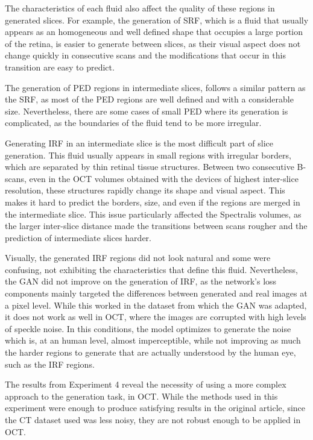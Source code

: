 \par
The characteristics of each fluid also affect the quality of these regions in generated slices. For example, the generation of SRF, which is a fluid that usually appears as an homogeneous and well defined shape that occupies a large portion of the retina, is easier to generate between slices, as their visual aspect does not change quickly in consecutive scans and the modifications that occur in this transition are easy to predict.
\par
The generation of PED regions in intermediate slices, follows a similar pattern as the SRF, as most of the PED regions are well defined and with a considerable size. Nevertheless, there are some cases of small PED where its generation is complicated, as the boundaries of the fluid tend to be more irregular.
\par
Generating IRF in an intermediate slice is the most difficult part of slice generation. This fluid usually appears in small regions with irregular borders, which are separated by thin retinal tissue structures. Between two consecutive B-scans, even in the OCT volumes obtained with the devices of highest inter-slice resolution, these structures rapidly change its shape and visual aspect. This makes it hard to predict the borders, size, and even if the regions are merged in the intermediate slice. This issue particularly affected the Spectralis volumes, as the larger inter-slice distance made the transitions between scans rougher and the prediction of intermediate slices harder.
\par
Visually, the generated IRF regions did not look natural and some were confusing, not exhibiting the characteristics that define this fluid. Nevertheless, the GAN did not improve on the generation of IRF, as the network's loss components mainly targeted the differences between generated and real images at a pixel level. While this worked in the dataset from which the GAN was adapted, it does not work as well in OCT, where the images are corrupted with high levels of speckle noise. In this conditions, the model optimizes to generate the noise which is, at an human level, almost imperceptible, while not improving as much the harder regions to generate that are actually understood by the human eye, such as the IRF regions.
\par
The results from Experiment 4 reveal the necessity of using a more complex approach to the generation task, in OCT. While the methods used in this experiment were enough to produce satisfying results in the original article, since the CT dataset used was less noisy, they are not robust enough to be applied in OCT.
